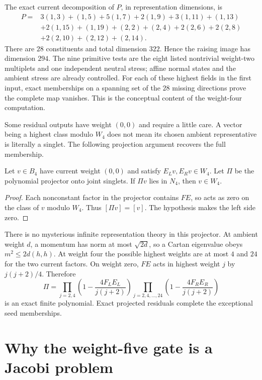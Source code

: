 The exact current decomposition of $P$, in representation dimensions,
is
\begin{align*}
 P={}&3(1,3)+(1,5)+5(1,7)+2(1,9)+3(1,11)+(1,13)\\
 &+2(1,15)+(1,19)+(2,2)+(2,4)+2(2,6)+2(2,8)\\
 &+2(2,10)+(2,12)+(2,14).
\end{align*}
There are $28$ constituents and total dimension $322$. Hence the
raising image has dimension $294$. The nine primitive tests are the
eight listed nontrivial weight-two multiplets and one independent neutral
stress; affine normal states and the ambient stress are already controlled.
For each of these highest fields in the first input, exact memberships
on a spanning set of the
$28$ missing directions prove the complete map vanishes. This is the
conceptual content of the weight-four computation.

Some residual outputs have weight $(0,0)$ and require a little care.
A vector being a highest class modulo $W_4$ does not mean its chosen
ambient representative is literally a singlet. The following projection
argument recovers the full membership.

\begin{lemma}
Let $v\in B_4$ have current weight $(0,0)$ and satisfy
$E_Lv,E_Rv\in W_4$. Let $\Pi$ be the polynomial projector onto
joint singlets. If $\Pi v$ lies in $N_4$, then $v\in W_4$.
\end{lemma}
\begin{proof}
Each nonconstant factor in the projector contains $FE$, so acts as
zero on the class of $v$ modulo $W_4$. Thus $[\Pi v]=[v]$.
The hypothesis makes the left side zero.
\end{proof}

There is no mysterious infinite representation theory in this
projector. At ambient weight $d$, a momentum has norm at most
$\sqrt{2d}$, so a Cartan eigenvalue obeys
$m^2\leq2d(h,h)$. At weight four the possible highest weights are
at most $4$ and $24$ for the two current factors. On weight zero,
$FE$ acts in highest weight $j$ by $j(j+2)/4$. Therefore
\[
 \Pi=\prod_{j=2,4}\left(1-\frac{4F_LE_L}{j(j+2)}\right)
 \prod_{j=2,4,\ldots,24}
                 \left(1-\frac{4F_RE_R}{j(j+2)}\right)
\]
is an exact finite polynomial. Exact projected residuals complete the
exceptional seed memberships.

\section{Why the weight-five gate is a Jacobi problem}

